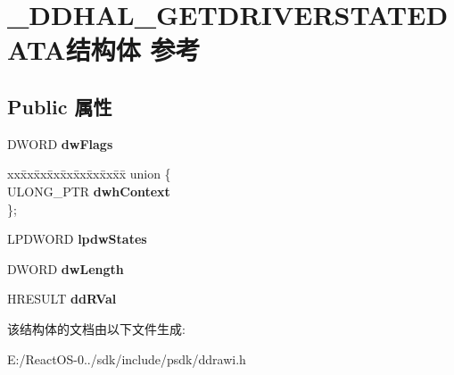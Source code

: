\hypertarget{struct___d_d_h_a_l___g_e_t_d_r_i_v_e_r_s_t_a_t_e_d_a_t_a}{}\section{\+\_\+\+D\+D\+H\+A\+L\+\_\+\+G\+E\+T\+D\+R\+I\+V\+E\+R\+S\+T\+A\+T\+E\+D\+A\+T\+A结构体 参考}
\label{struct___d_d_h_a_l___g_e_t_d_r_i_v_e_r_s_t_a_t_e_d_a_t_a}
\subsection*{Public 属性}
\begin{DoxyCompactItemize}
\item 
\mbox{\label{struct___d_d_h_a_l___g_e_t_d_r_i_v_e_r_s_t_a_t_e_d_a_t_a_a6f289540fa25070a7d5aaeafabe05a63}} 
D\+W\+O\+RD {\bfseries dw\+Flags}
\item 
\mbox{\label{struct___d_d_h_a_l___g_e_t_d_r_i_v_e_r_s_t_a_t_e_d_a_t_a_ad0e057da8b88935be71a691ef521c8aa}} 
\begin{tabbing}
xx\=xx\=xx\=xx\=xx\=xx\=xx\=xx\=xx\=\kill
union \{\\
\>ULONG\_PTR {\bfseries dwhContext}\\
\}; \\

\end{tabbing}\item 
\mbox{\label{struct___d_d_h_a_l___g_e_t_d_r_i_v_e_r_s_t_a_t_e_d_a_t_a_aa99d327aa7c05067174de5e7570ac5ea}} 
L\+P\+D\+W\+O\+RD {\bfseries lpdw\+States}
\item 
\mbox{\label{struct___d_d_h_a_l___g_e_t_d_r_i_v_e_r_s_t_a_t_e_d_a_t_a_a154b9128ecd983dfea172e44c3162fad}} 
D\+W\+O\+RD {\bfseries dw\+Length}
\item 
\mbox{\label{struct___d_d_h_a_l___g_e_t_d_r_i_v_e_r_s_t_a_t_e_d_a_t_a_a5b2a27602bc70f4e614c23cdaba25e93}} 
H\+R\+E\+S\+U\+LT {\bfseries dd\+R\+Val}
\end{DoxyCompactItemize}


该结构体的文档由以下文件生成\+:\begin{DoxyCompactItemize}
\item 
E\+:/\+React\+O\+S-\/0../sdk/include/psdk/ddrawi.\+h\end{DoxyCompactItemize}
